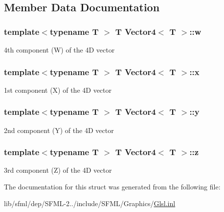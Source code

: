 \subsection{Member Data Documentation}
\hypertarget{struct_vector4_a83daff43fa2b88b4e76474f4b9a45276}{
\subsubsection[{w}]{\setlength{\rightskip}{0pt plus 5cm}template$<$typename T $>$ {\bf T} {\bf Vector4}$<$ {\bf T} $>$\-::w}}\label{struct_vector4_a83daff43fa2b88b4e76474f4b9a45276}


4th component (W) of the 4\-D vector 

\hypertarget{struct_vector4_a2cedf20d2f695a4f0254681b13311ac9}{
\subsubsection[{x}]{\setlength{\rightskip}{0pt plus 5cm}template$<$typename T $>$ {\bf T} {\bf Vector4}$<$ {\bf T} $>$\-::x}}\label{struct_vector4_a2cedf20d2f695a4f0254681b13311ac9}


1st component (X) of the 4\-D vector 

\hypertarget{struct_vector4_aad001ba27515dc2dcb921e9c83596520}{
\subsubsection[{y}]{\setlength{\rightskip}{0pt plus 5cm}template$<$typename T $>$ {\bf T} {\bf Vector4}$<$ {\bf T} $>$\-::y}}\label{struct_vector4_aad001ba27515dc2dcb921e9c83596520}


2nd component (Y) of the 4\-D vector 

\hypertarget{struct_vector4_a5a7a1452d661e0b24e4b04c4dbff8ae7}{
\subsubsection[{z}]{\setlength{\rightskip}{0pt plus 5cm}template$<$typename T $>$ {\bf T} {\bf Vector4}$<$ {\bf T} $>$\-::z}}\label{struct_vector4_a5a7a1452d661e0b24e4b04c4dbff8ae7}


3rd component (Z) of the 4\-D vector 



The documentation for this struct was generated from the following file\-:\begin{DoxyCompactItemize}
\item 
lib/sfml/dep/\-S\-F\-M\-L-\/2../include/\-S\-F\-M\-L/\-Graphics/\hyperlink{_glsl_8inl}{Glsl.\-inl}\end{DoxyCompactItemize}
